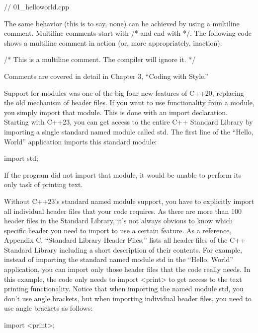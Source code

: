 \begin{cpp}
// 01_helloworld.cpp
\end{cpp}

The same behavior (this is to say, none) can be achieved by using a multiline comment. Multiline comments start with /* and end with */. The following code shows a multiline comment in action (or, more appropriately, inaction):

\begin{cpp}
/* This is a multiline comment.
   The compiler will ignore it.
*/
\end{cpp}

Comments are covered in detail in Chapter 3, “Coding with Style.”


Support for modules was one of the big four new features of C++20, replacing the old mechanism of header files. If you want to use functionality from a module, you simply import that module. This is done with an import declaration. Starting with C++23, you can get access to the entire C++ Standard Library by importing a single standard named module called std. The first line of the “Hello, World” application imports this standard module:

\begin{cpp}
import std;
\end{cpp}

If the program did not import that module, it would be unable to perform its only task of printing text.

Without C++23’s standard named module support, you have to explicitly import all individual header files that your code requires. As there are more than 100 header files in the Standard Library, it’s not always obvious to know which specific header you need to import to use a certain feature. As a reference, Appendix C, “Standard Library Header Files,” lists all header files of the C++ Standard Library including a short description of their contents. For example, instead of importing the standard named module std in the “Hello, World” application, you can import only those header files that the code really needs. In this example, the code only needs to import <print> to get access to the text printing functionality. Notice that when importing the named module std, you don’t use angle brackets, but when importing individual header files, you need to use angle brackets as follows:

\begin{cpp}
import <print>;
\end{cpp}

